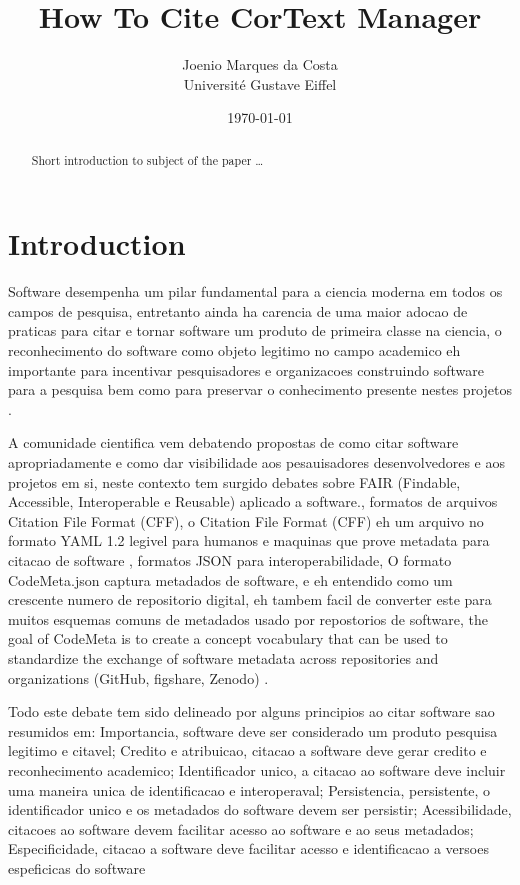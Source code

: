 \documentclass{article}
\title{
  How To Cite CorText Manager
}
\author{
  Joenio Marques da Costa \\
  Université Gustave Eiffel
}
\date{\today}
\begin{document}
\maketitle

\begin{abstract}
Short introduction to subject of the paper \ldots 
\end{abstract}

\section{Introduction}

Software desempenha um pilar fundamental para a ciencia moderna em todos os
campos de pesquisa, entretanto ainda ha carencia de uma maior adocao de
praticas para citar e tornar software um produto de primeira classe na ciencia,
o reconhecimento do software como objeto legitimo no campo academico eh
importante para incentivar pesquisadores e organizacoes construindo software
para a pesquisa bem como para preservar o conhecimento presente nestes projetos
\cite{alliez_attributing_2020}.

A comunidade cientifica vem debatendo propostas de como citar software apropriadamente
e como dar visibilidade aos pesauisadores desenvolvedores e aos projetos em si,
neste contexto tem surgido debates sobre FAIR (Findable, Accessible,
Interoperable e Reusable) aplicado a software\cite{noauthor_fair_nodate}., formatos de arquivos Citation File Format (CFF),
o Citation File Format (CFF) eh um arquivo no formato YAML 1.2 legivel para humanos e
maquinas que prove metadata para citacao de software \cite{chue_hong_software_2019},
formatos JSON para interoperabilidade,
O formato CodeMeta.json captura metadados de software, e eh entendido como um crescente
numero de repositorio digital, eh tambem facil de converter este para muitos esquemas
comuns de metadados usado por repostorios de software,
the goal of CodeMeta is to create a concept vocabulary that can be used to
standardize the exchange of software metadata across repositories and
organizations (GitHub, figshare, Zenodo) \cite{druskat_citation_2019}.

Todo este debate tem sido delineado por alguns principios ao citar software sao resumidos em: Importancia, software deve ser considerado um produto pesquisa legitimo e citavel;
Credito e atribuicao, citacao a software deve gerar credito e reconhecimento academico;
Identificador unico, a citacao ao software deve incluir uma maneira unica de identificacao e interoperaval;
Persistencia, persistente, o identificador unico e os metadados do software devem ser persistir;
Acessibilidade, citacoes ao software devem facilitar acesso ao software e ao seus metadados;
Especificidade, citacao a software deve facilitar acesso e identificacao a versoes espeficicas do software \cite{smith_software_2016}
\end{document}
